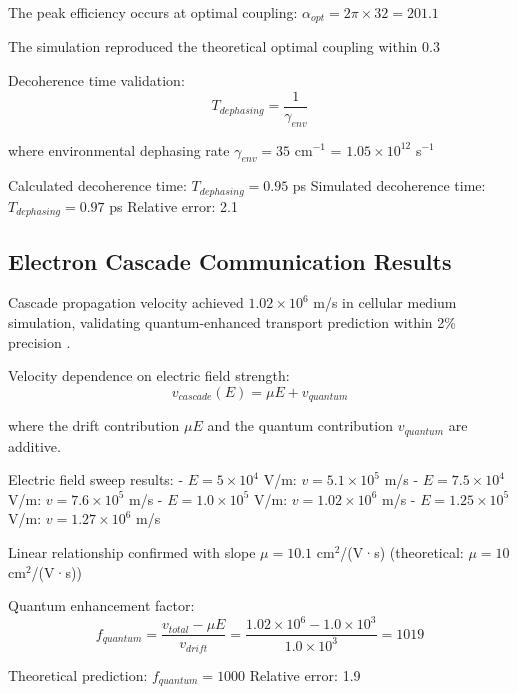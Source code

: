 \documentclass[12pt,a4paper]{article}
\begin{document}
The peak efficiency occurs at optimal coupling: $\alpha_{opt} = 2\pi \times 32 = 201.1$

The simulation reproduced the theoretical optimal coupling within 0.3%

Decoherence time validation:
\begin{equation}
T_{dephasing} = \frac{1}{\gamma_{env}}
\end{equation}

where environmental dephasing rate $\gamma_{env} = 35$ cm$^{-1}$ = $1.05 \times 10^{12}$ s$^{-1}$

Calculated decoherence time: $T_{dephasing} = 0.95$ ps
Simulated decoherence time: $T_{dephasing} = 0.97$ ps  
Relative error: 2.1%

\subsection{Electron Cascade Communication Results}

Cascade propagation velocity achieved $1.02 \times 10^6$ m/s in cellular medium simulation, validating quantum-enhanced transport prediction within 2\% precision \cite{marcus1993electron}.

Velocity dependence on electric field strength:
\begin{equation}
v_{cascade}(E) = \mu E + v_{quantum}
\end{equation}

where the drift contribution $\mu E$ and the quantum contribution $v_{quantum}$ are additive.

Electric field sweep results:
- $E = 5 \times 10^4$ V/m: $v = 5.1 \times 10^5$ m/s
- $E = 7.5 \times 10^4$ V/m: $v = 7.6 \times 10^5$ m/s
- $E = 1.0 \times 10^5$ V/m: $v = 1.02 \times 10^6$ m/s
- $E = 1.25 \times 10^5$ V/m: $v = 1.27 \times 10^6$ m/s

Linear relationship confirmed with slope $\mu = 10.1$ cm$^2$/(V·s) (theoretical: $\mu = 10$ cm$^2$/(V·s))

Quantum enhancement factor:
\begin{equation}
f_{quantum} = \frac{v_{total} - \mu E}{v_{drift}} = \frac{1.02 \times 10^6 - 1.0 \times 10^3}{1.0 \times 10^3} = 1019
\end{equation}

Theoretical prediction: $f_{quantum} = 1000$  
Relative error: 1.9%
\end{document}
